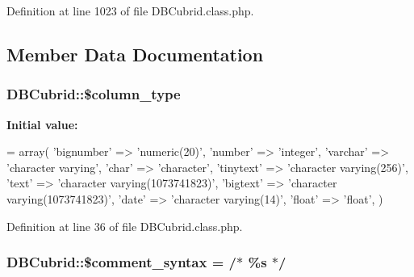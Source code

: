 Definition at line 1023 of file D\+B\+Cubrid.\+class.\+php.



\subsection{Member Data Documentation}
\subsubsection[{\texorpdfstring{\$column\+\_\+type}{$column_type}}]{\setlength{\rightskip}{0pt plus 5cm}D\+B\+Cubrid\+::\$column\+\_\+type}\hypertarget{classDBCubrid_a92995e5eed892ec4076cb3c1f5fdb2f1}{}\label{classDBCubrid_a92995e5eed892ec4076cb3c1f5fdb2f1}
{\bfseries Initial value\+:}
\begin{DoxyCode}
= array(
        \textcolor{stringliteral}{'bignumber'} => \textcolor{stringliteral}{'numeric(20)'},
        \textcolor{stringliteral}{'number'} => \textcolor{stringliteral}{'integer'},
        \textcolor{stringliteral}{'varchar'} => \textcolor{stringliteral}{'character varying'},
        \textcolor{stringliteral}{'char'} => \textcolor{stringliteral}{'character'},
        \textcolor{stringliteral}{'tinytext'} => \textcolor{stringliteral}{'character varying(256)'},
        \textcolor{stringliteral}{'text'} => \textcolor{stringliteral}{'character varying(1073741823)'},
        \textcolor{stringliteral}{'bigtext'} => \textcolor{stringliteral}{'character varying(1073741823)'},
        \textcolor{stringliteral}{'date'} => \textcolor{stringliteral}{'character varying(14)'},
        \textcolor{stringliteral}{'float'} => \textcolor{stringliteral}{'float'},
    )
\end{DoxyCode}


Definition at line 36 of file D\+B\+Cubrid.\+class.\+php.

\subsubsection[{\texorpdfstring{\$comment\+\_\+syntax}{$comment_syntax}}]{\setlength{\rightskip}{0pt plus 5cm}D\+B\+Cubrid\+::\$comment\+\_\+syntax = \textquotesingle{}/$\ast$ \%{\bf s} $\ast$/\textquotesingle{}}\hypertarget{classDBCubrid_a0060c7dcaf443efddbe4492d4479fe0b}{}\label{classDBCubrid_a0060c7dcaf443efddbe4492d4479fe0b}


